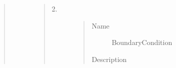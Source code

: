 \documentclass[letterpaper,10pt,english]{sphinxmanual}
\begin{document}
\begin{quote}
\begin{description}
\begin{quote}
\begin{description}
\begin{quote}
\begin{description}
\end{description}\end{quote}

\item[{2.}] \leavevmode\begin{quote}\begin{description}
\item[{Name}] \leavevmode
BoundaryCondition

\item[{Description}] \leavevmode
{}

\end{description}\end{quote}

\end{description}\end{quote}

\end{description}\end{quote}
\end{document}
